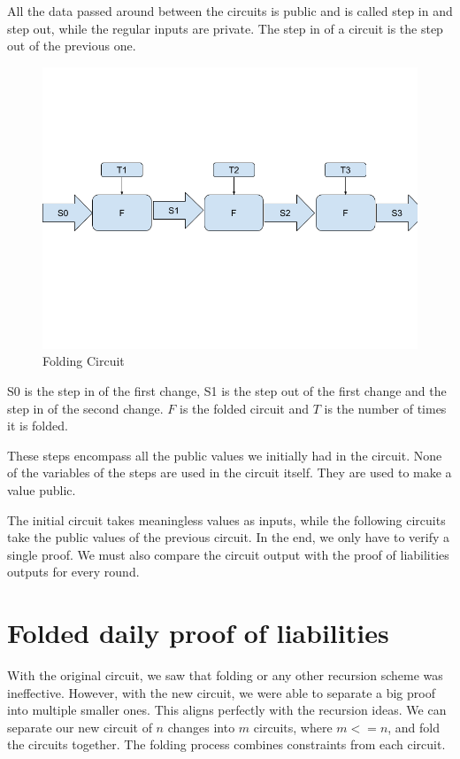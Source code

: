 All the data passed around between the circuits is public and is called step in and step out, while the regular inputs are private.
The step in of a circuit is the step out of the previous one.

\begin{figure}[H]
   \centering
   \includegraphics[width=130mm]{FoldingCircuit.png}
   \caption{Folding Circuit}
   \label{overflow}
   \end{figure}

S0 is the step in of the first change, S1 is the step out of the first change and the step in of the second change. $F$ is the folded circuit
and $T$ is the number of times it is folded.

These steps encompass all the public values we initially had in the circuit.
None of the variables of the steps are used in the circuit itself. They are used to make a value public.

The initial circuit takes meaningless values as inputs, while the following circuits take the public values of the previous circuit.
In the end, we only have to verify a single proof. We must also compare the circuit output with the proof of liabilities outputs for every round.

\section{Folded daily proof of liabilities}
With the original circuit, we saw that folding or any other recursion scheme was ineffective.
However, with the new circuit, we were able to separate a big proof into multiple smaller ones.
This aligns perfectly with the recursion ideas.
We can separate our new circuit of $n$ changes into $m$ circuits, where $m <= n$, and fold the circuits together. 
The folding process combines constraints from each circuit.

